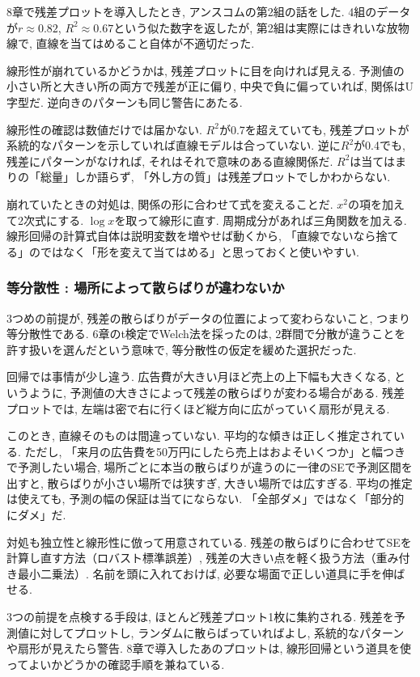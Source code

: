 8章で残差プロットを導入したとき, アンスコムの第2組の話をした.
4組のデータが$r \approx 0.82$, $R^2 \approx 0.67$という似た数字を返したが, 第2組は実際にはきれいな放物線で, 直線を当てはめること自体が不適切だった.

線形性が崩れているかどうかは, 残差プロットに目を向ければ見える.
予測値の小さい所と大きい所の両方で残差が正に偏り, 中央で負に偏っていれば, 関係はU字型だ.
逆向きのパターンも同じ警告にあたる.

線形性の確認は数値だけでは届かない.
$R^2$が0.7を超えていても, 残差プロットが系統的なパターンを示していれば直線モデルは合っていない.
逆に$R^2$が0.4でも, 残差にパターンがなければ, それはそれで意味のある直線関係だ.
$R^2$は当てはまりの「総量」しか語らず, 「外し方の質」は残差プロットでしかわからない.

崩れていたときの対処は, 関係の形に合わせて式を変えることだ.
$x^2$の項を加えて2次式にする. $\log x$を取って線形に直す. 周期成分があれば三角関数を加える.
線形回帰の計算式自体は説明変数を増やせば動くから, 「直線でないなら捨てる」のではなく「形を変えて当てはめる」と思っておくと使いやすい.

\subsubsection*{等分散性 : 場所によって散らばりが違わないか}

3つめの前提が, 残差の散らばりがデータの位置によって変わらないこと, つまり等分散性である.
6章のt検定でWelch法を採ったのは, 2群間で分散が違うことを許す扱いを選んだという意味で, 等分散性の仮定を緩めた選択だった.

回帰では事情が少し違う.
広告費が大きい月ほど売上の上下幅も大きくなる, というように, 予測値の大きさによって残差の散らばりが変わる場合がある.
残差プロットでは, 左端は密で右に行くほど縦方向に広がっていく扇形が見える.

このとき, 直線そのものは間違っていない.
平均的な傾きは正しく推定されている.
ただし, 「来月の広告費を50万円にしたら売上はおよそいくつか」と幅つきで予測したい場合, 場所ごとに本当の散らばりが違うのに一律のSEで予測区間を出すと, 散らばりが小さい場所では狭すぎ, 大きい場所では広すぎる.
平均の推定は使えても, 予測の幅の保証は当てにならない. 「全部ダメ」ではなく「部分的にダメ」だ.

対処も独立性と線形性に倣って用意されている.
残差の散らばりに合わせてSEを計算し直す方法（ロバスト標準誤差）, 残差の大きい点を軽く扱う方法（重み付き最小二乗法）.
名前を頭に入れておけば, 必要な場面で正しい道具に手を伸ばせる.

3つの前提を点検する手段は, ほとんど残差プロット1枚に集約される.
残差を予測値に対してプロットし, ランダムに散らばっていればよし, 系統的なパターンや扇形が見えたら警告.
8章で導入したあのプロットは, 線形回帰という道具を使ってよいかどうかの確認手順を兼ねている.

